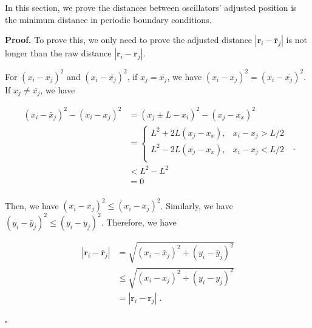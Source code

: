 \documentclass[%
 aip,
 amsmath,amssymb,
 reprint,%
]{revtex4-1}
\newenvironment{proof}{\noindent\textbf{Proof.}}{\hfill $\square$\par}
\begin{document}
In this section, we prove the distances between oscillators' adjusted position is the minimum distance in periodic boundary conditions. 

\begin{proof}
    To prove this, we only need to prove the adjusted distance $\left| \mathbf{r}_i-\bar{\mathbf{r}}_j \right|$ is not longer than the raw distance $\left| \mathbf{r}_i-\mathbf{r}_j \right|$.
    
    For $\left( x_i-x_j \right) ^2$ and $\left( x_i-\bar{x_j} \right) ^2$, if $x_j=\bar{x_j}$, we have $\left( x_i-x_j \right) ^2=\left( x_i-\bar{x_j} \right) ^2$. If $x_j\ne \bar{x_j}$, we have

    \begin{equation}
        \begin{aligned}
            \left( x_i-\bar{x}_j \right) ^2-\left( x_i-x_j \right) ^2&=\left( x_j\pm L-x_i \right) ^2-\left( x_j-x_x \right) ^2\\
            &=\begin{cases}
            L^2+2L\left( x_j-x_x \right) ,&		x_i-x_j>L/2\\
            L^2-2L\left( x_j-x_x \right) ,&		x_i-x_j<L/2\\
        \end{cases}\\
            &<L^2-L^2\\
            &=0\\
        \end{aligned}\;.
    \end{equation}

    Then, we have $\left( x_i-\bar{x}_j \right) ^2\leqslant \left( x_i-x_j \right) ^2$. Similarly, we have $\left( y_i-\bar{y}_j \right) ^2\leqslant \left( y_i-y_j \right) ^2$. Therefore, we have 

    \begin{equation}
        \begin{aligned}
            \left| \mathbf{r}_i-\bar{\mathbf{r}}_j \right|&=\sqrt{\left( x_i-\bar{x}_j \right) ^2+\left( y_i-\bar{y}_j \right) ^2}\\
            &\leqslant \sqrt{\left( x_i-x_j \right) ^2+\left( y_i-y_j \right) ^2}\\
            &=\left| \mathbf{r}_i-\mathbf{r}_j \right|\;.
        \end{aligned}
    \end{equation}

\end{proof}
\end{document}
